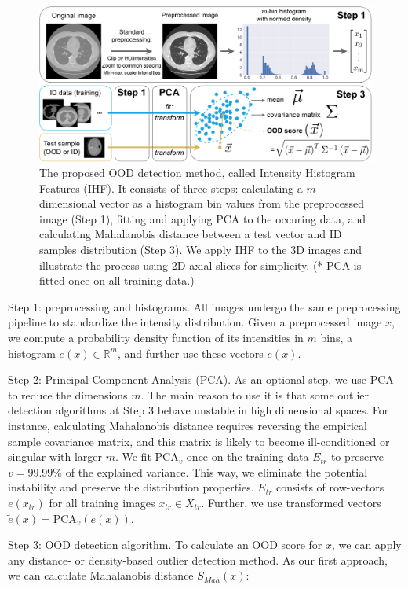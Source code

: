 \begin{figure}[h]
	\centering
	\includegraphics[width=\textwidth]{Dissertation/Figures/5_ood_bench/method-1.pdf}
	\caption{The proposed OOD detection method, called Intensity Histogram Features (IHF). It consists of three steps: calculating a $m$-dimensional vector as a histogram bin values from the preprocessed image (Step 1), fitting and applying PCA to the occuring data, and calculating Mahalanobis distance between a test vector and ID samples distribution (Step 3). We apply IHF to the 3D images and illustrate the process using 2D axial slices for simplicity. (* PCA is fitted once on all training data.)}
	\label{fig:ihf}
\end{figure}

Step 1: preprocessing and histograms. All images undergo the same preprocessing pipeline to standardize the intensity distribution. Given a preprocessed image $x$, we compute a probability density function of its intensities in $m$ bins, a histogram $e(x) \in \mathbb{R}^m$, and further use these vectors $e(x)$.
	
Step 2: Principal Component Analysis (PCA). As an optional step, we use PCA~\cite{pca} to reduce the dimensions $m$. The main reason to use it is that some outlier detection algorithms at Step 3 behave unstable in high dimensional spaces. For instance, calculating Mahalanobis distance requires reversing the empirical sample covariance matrix, and this matrix is likely to become ill-conditioned or singular with larger $m$. We fit PCA$_v$ once on the training data $E_{tr}$ to preserve $v = 99.99\%$ of the explained variance. This way, we eliminate the potential instability and preserve the distribution properties. $E_{tr}$ consists of row-vectors $e(x_{tr})$ for all training images $x_{tr} \in X_{tr}$. Further, we use transformed vectors $\tilde{e}(x) = \text{PCA}_v (e(x))$.
	
Step 3: OOD detection algorithm. To calculate an OOD score for $x$, we can apply any distance- or density-based outlier detection method. As our first approach, we can calculate Mahalanobis distance $S_{Mah}(x)$:

